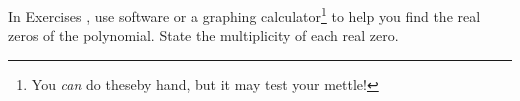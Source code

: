 {\noindent In Exercises}
{, use software or a graphing calculator\footnote{You \textit{can} do theseby hand, but it may test your mettle!} to help you find the real zeros of the polynomial.  State the multiplicity of each real zero.}

